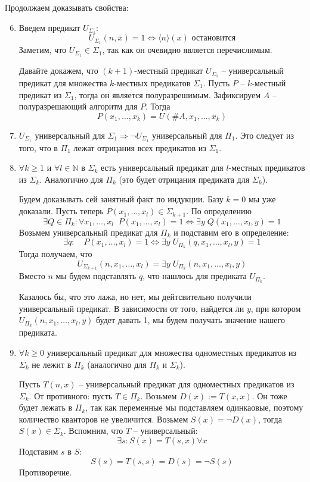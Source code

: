 Продолжаем доказывать свойства: \begin{enumerate}
    \setcounter{enumi}{5}
    \item Введем предикат $U_{\Sigma_1}$: \[ U_{\Sigma_1}(n, \bar{x}) = 1 \Leftrightarrow \langle n \rangle (x) \text{ остановится} \]
    Заметим, что $U_{\Sigma_1} \in \Sigma_1$, так как он очевидно является перечислимым.

    Давайте докажем, что $(k+1)$-местный предикат $U_{\Sigma_1}$ -- универсальный предикат для множества $k$-местных предикатов $\Sigma_1$. Пусть $P$ -- $k$-местный предикат из $\Sigma_1$, тогда он является полуразрешимым. Зафиксируем $A$ -- полуразрешающий алгоритм для $P$. Тогда \[ P(x_1, \dots, x_k) = U(\#A, x_1, \dots, x_k) \]

    \item $U_{\Sigma_1}$ универсальный для $\Sigma_1 \Longrightarrow \lnot U_{\Sigma_1}$ универсальный для $\Pi_1$. Это следует из того, что в $\Pi_1$ лежат отрицания всех предикатов из $\Sigma_1$.
    \item $\forall k \geqslant 1$ и $\forall l \in \mathbb{N}$ в $\Sigma_k$ есть универсальный предикат для $l$-местных предикатов из $\Sigma_k$. Аналогично для $\Pi_k$ (это будет отрицания предиката для $\Sigma_k$).
    
    Будем доказывать сей занятный факт по индукции. Базу $k = 0$ мы уже доказали. Пусть теперь $P(x_1, \dots, x_l) \in \Sigma_{k+1}$. По определению \[ \exists Q \in \Pi_k : \forall x_1, \dots, x_l \;\; P(x_1, \dots, x_l) = 1 \Leftrightarrow \exists y \; Q(x_1, \dots, x_l, y) = 1 \] Возьмем универсальный предикат для $\Pi_k$ и подставим его в определение: \[ \exists q : \quad P(x_1, \dots, x_l) = 1 \Leftrightarrow \exists y \; U_{\Pi_k}(q, x_1, \dots, x_l, y) = 1 \] Тогда получаем, что \[ U_{\Sigma_{k+1}}(n, x_1, \dots, x_l) =   \exists y \; U_{\Pi_k}(n, x_1, \dots, x_l, y) \] Вместо $n$ мы будем подставлять $q$, что нашлось для предиката $U_{\Pi_k}$. 

    Казалось бы, что это лажа, но нет, мы дейтсвительно получили универсальный предикат. В зависимости от того, найдется ли $y$, при котором $U_{\Pi_k}(n, x_1, \dots, x_l, y)$ будет давать 1, мы будем получать значение нашего предиката.

    \item $\forall k \geqslant 0$ универсальный предикат для множества одноместных предикатов из $\Sigma_k$ не лежит в $\Pi_k$ (аналогично для $\Pi_k$ и $\Sigma_k$).
    
    Пусть $T(n, x)$ -- универсальный предикат для одноместных предикатов из $\Sigma_k$. От противного: пусть $T \in \Pi_k$. Возьмем $D(x) := T(x, x)$. Он тоже будет лежать в $\Pi_k$, так как переменные мы подставляем одинкаовые, поэтому количество кванторов не увеличится. Возьмем $S(x) = \lnot D(x)$, тогда $S(x) \in \Sigma_k$. Вспомним, что $T$ -- универсальный: \[ \exists s : S(x) = T(s, x) \forall x \]
    Подставим $s$ в $S$: \[ S(s) = T(s, s) = D(s) = \lnot S(s) \]
    Противоречие.


\end{enumerate}
